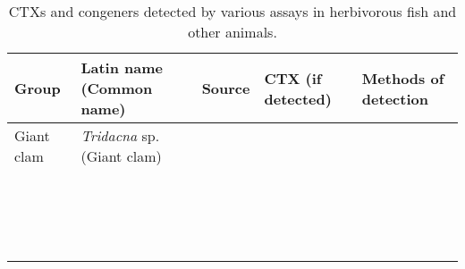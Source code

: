 \documentclass[12pt]{article}
\begin{document}
\begin{table}
\caption{CTXs and congeners detected by various assays in herbivorous fish and other animals.}
\label{tbl:HerbTable}
\begin{tabular}{| p{2cm} | p{3cm} | p{4.5cm} | p{2cm} | p{3cm} | }
\hline
\textbf{Group} & \textbf{Latin name} (Common name) & \textbf{Source} & \textbf{CTX (if detected)} & \textbf{Methods of detection} \\
\hline
 Giant clam &  \emph{Tridacna} sp. (Giant clam) &  &  & \\
  & \emph{}  &  &  & \\
  & \emph{} &  &  & \\
  &  \emph{} &  &  & \\
  & \emph{}  &  &  & \\
  & \emph{} &  &  & \\
  &  \emph{} &  &  & \\
  & \emph{}  &  &  & \\
  & \emph{} &  &  & \\
  &  \emph{} &  &  & \\
  & \emph{}  &  &  & \\
  & \emph{} &  &  & \\
  &  \emph{} &  &  & \\
  & \emph{}  &  &  & \\
  & \emph{} &  &  & \\
  &  \emph{} &  &  & \\
  & \emph{}  &  &  & \\
  & \emph{} &  &  & \\
\end{tabular}
\end{table}
\FloatBarrier
\end{document}
